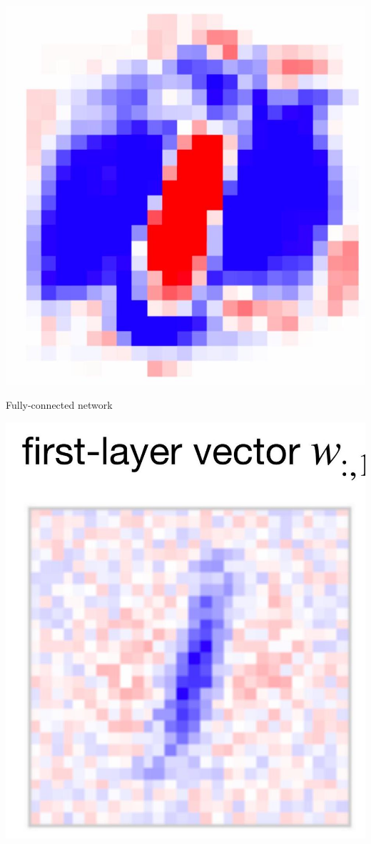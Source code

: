 \documentclass[10pt]{article}
\begin{document}
\begin{center}
\includegraphics[max width=\textwidth]{2024_01_08_959e2db67a31f073f6d2g-15(4)}
\end{center}

Fully-connected network

\begin{center}
\includegraphics[max width=\textwidth]{2024_01_08_959e2db67a31f073f6d2g-15(5)}
\end{center}
\end{document}
